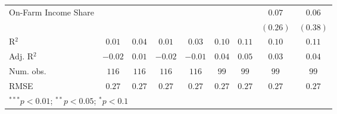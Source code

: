 \documentclass[
]{article}
\begin{document}
\begin{table}
\begin{center}
\begin{tabular}{l c c c c c c c c}
On-Farm Income Share &                      &                      &                       &                      &                       &                        & $0.07$                & $0.06$                \\
                     &                      &                      &                       &                      &                       &                        & $(0.26)$              & $(0.38)$              \\
\hline
R$^2$                & $0.01$               & $0.04$               & $0.01$                & $0.03$               & $0.10$                & $0.11$                 & $0.10$                & $0.11$                \\
Adj. R$^2$           & $-0.02$              & $0.01$               & $-0.02$               & $-0.01$              & $0.04$                & $0.05$                 & $0.03$                & $0.04$                \\
Num. obs.            & $116$                & $116$                & $116$                 & $116$                & $99$                  & $99$                   & $99$                  & $99$                  \\
RMSE                 & $0.27$               & $0.27$               & $0.27$                & $0.27$               & $0.27$                & $0.27$                 & $0.27$                & $0.27$                \\
\hline
\multicolumn{9}{l}{\scriptsize{$^{***}p<0.01$; $^{**}p<0.05$; $^{*}p<0.1$}}
\end{tabular}
\label{table:coefficients}
\end{center}
\end{table}
\end{document}

